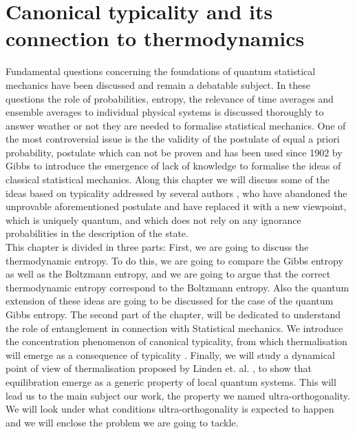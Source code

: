 \chapter{Canonical typicality and its connection to thermodynamics}
Fundamental questions concerning the foundations of quantum statistical mechanics have been discussed and remain a debatable subject\cite{singh_foundations_2013}. In these questions the role of probabilities, entropy, the relevance of time averages and ensemble averages to individual physical systems is discussed thoroughly \cite{gemmer_quantum_2004} to answer weather or not they are needed to formalise statistical mechanics. One of the most controversial issue is the  the validity of the postulate of equal a priori probability, postulate which can not be proven\cite{singh_foundations_2013} and has been used since 1902 by Gibbs \cite{gibbs_elementary_1902} to introduce the emergence of lack of knowledge to formalise the ideas of classical statistical mechanics. Along this chapter we will discuss some of the ideas based on typicality addressed by several authors \cite{gemmer_quantum_2004, goldstein_canonical_2006, popescu_entanglement_2006}, who have abandoned the unprovable aforementioned postulate and have replaced it with a new viewpoint, which is uniquely quantum, and which does not rely on any ignorance probabilities in the description of the state.\\
\indent This chapter is divided in three parts: First, we are going to discuss the thermodynamic entropy. To do this, we are going to compare the Gibbs entropy as well as the Boltzmann entropy, and we are going to argue that the correct thermodynamic entropy correspond to the Boltzmann entropy. Also the quantum extension of these ideas are going to be discussed for the case of the quantum Gibbs entropy. The second part of the chapter, will be dedicated to understand the role of entanglement in connection with Statistical mechanics. We introduce the concentration phenomenon of canonical typicality, from which thermalisation will emerge as a consequence of typicality \cite{popescu_entanglement_2006, popescu_foundations_2005}. Finally, we will study a dynamical point of view of thermalisation proposed by Linden et. al. \cite{linden_quantum_2009}, to show that equilibration emerge as a generic property of local quantum systems. This will lead us to the main subject our work, the property we named ultra-orthogonality. We will look under what conditions ultra-orthogonality is expected to happen and we will enclose the problem we are going to tackle.

